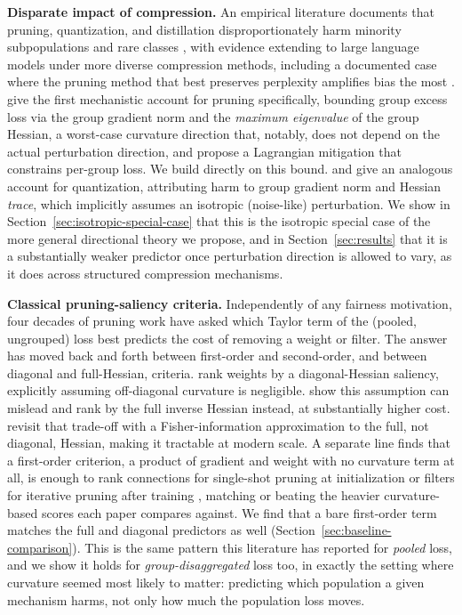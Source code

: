 \documentclass{article}
\begin{document}
\textbf{Disparate impact of compression.} An empirical literature documents that pruning, quantization, and distillation disproportionately harm minority subpopulations and rare classes \citep{hooker2020characterising,iofinova2023bias}, with evidence extending to large language models under more diverse compression methods, including a documented case where the pruning method that best preserves perplexity amplifies bias the most \citep{wu2026asymmetric,rath2026weight}. \citet{tran2022pruning} give the first mechanistic account for pruning specifically, bounding group excess loss via the group gradient norm and the \emph{maximum eigenvalue} of the group Hessian, a worst-case curvature direction that, notably, does not depend on the actual perturbation direction, and propose a Lagrangian mitigation that constrains per-group loss. We build directly on this bound. \citet{liu2025understanding} and \citet{bellam2024causes,bellam2025explaining} give an analogous account for quantization, attributing harm to group gradient norm and Hessian \emph{trace}, which implicitly assumes an isotropic (noise-like) perturbation. We show in Section~\ref{sec:isotropic-special-case} that this is the isotropic special case of the more general directional theory we propose, and in Section~\ref{sec:results} that it is a substantially weaker predictor once perturbation direction is allowed to vary, as it does across structured compression mechanisms.

\textbf{Classical pruning-saliency criteria.} Independently of any fairness motivation, four decades of pruning work have asked which Taylor term of the (pooled, ungrouped) loss best predicts the cost of removing a weight or filter. The answer has moved back and forth between first-order and second-order, and between diagonal and full-Hessian, criteria. \citet{lecun1990obd} rank weights by a diagonal-Hessian saliency, explicitly assuming off-diagonal curvature is negligible. \citet{hassibi1993obs} show this assumption can mislead and rank by the full inverse Hessian instead, at substantially higher cost. \citet{singh2020woodfisher} revisit that trade-off with a Fisher-information approximation to the full, not diagonal, Hessian, making it tractable at modern scale. A separate line finds that a first-order criterion, a product of gradient and weight with no curvature term at all, is enough to rank connections for single-shot pruning at initialization \citep{lee2019snip} or filters for iterative pruning after training \citep{molchanov2019importance}, matching or beating the heavier curvature-based scores each paper compares against. We find that a bare first-order term matches the full and diagonal predictors as well (Section~\ref{sec:baseline-comparison}). This is the same pattern this literature has reported for \emph{pooled} loss, and we show it holds for \emph{group-disaggregated} loss too, in exactly the setting where curvature seemed most likely to matter: predicting which population a given mechanism harms, not only how much the population loss moves.
\end{document}
